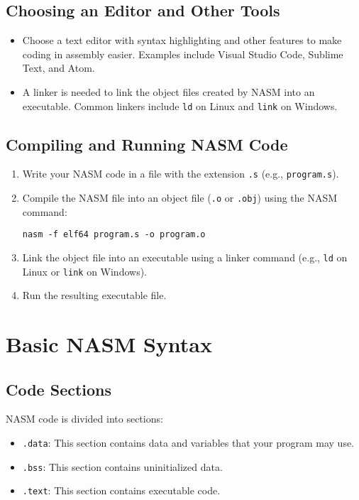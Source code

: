 \documentclass{article}
\begin{document}
\subsection{Choosing an Editor and Other Tools}
\begin{itemize}
    \item Choose a text editor with syntax highlighting and other features to make coding in assembly easier. Examples include Visual Studio Code, Sublime Text, and Atom.
    \item A linker is needed to link the object files created by NASM into an executable. Common linkers include \texttt{ld} on Linux and \texttt{link} on Windows.
\end{itemize}

\subsection{Compiling and Running NASM Code}
\begin{enumerate}
    \item Write your NASM code in a file with the extension \texttt{.s} (e.g., \texttt{program.s}).
    \item Compile the NASM file into an object file (\texttt{.o} or \texttt{.obj}) using the NASM command:
    \begin{lstlisting}
nasm -f elf64 program.s -o program.o
    \end{lstlisting}
    \item Link the object file into an executable using a linker command (e.g., \texttt{ld} on Linux or \texttt{link} on Windows).
    \item Run the resulting executable file.
\end{enumerate}

\section{Basic NASM Syntax}

\subsection{Code Sections}
NASM code is divided into sections:
\begin{itemize}
    \item \texttt{.data}: This section contains data and variables that your program may use.
    \item \texttt{.bss}: This section contains uninitialized data.
    \item \texttt{.text}: This section contains executable code.
\end{itemize}
\end{document}

